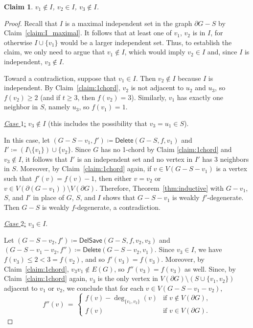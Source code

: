 \documentclass[11pt]{article}
\theoremstyle{slantthm}
\newtheorem{claim}{Claim}%
\numberwithin{equation}{section}
\theoremstyle{definition}
\renewcommand{\leq}{\leqslant}
\renewcommand{\geq}{\geqslant}
\newcommand{\defeq}{\coloneqq}
\newcommand{\bemph}[1]{{\normalfont#1}}
\newcommand{\ep}[1]{\bemph{(}#1\bemph{)}}
\numberwithin{equation}{section}
\newcommand{\0}{\varnothing}
\newcommand{\set}[1]{\{#1\}}
\newcommand{\del}{\mathsf{Delete}}
\newcommand{\delsave}{\mathsf{DelSave}}
\newcommand{\bdry}[1]{{\partial #1}}
\begin{document}
    \begin{claim}\label{claim:in}
        $v_1 \notin I$, $v_2 \in I$, $v_3 \notin I$.
    \end{claim}
    \begin{proof}
        Recall that $I$ is a maximal independent set in the graph $\bdry{G} - S$ by Claim~\ref{claim:I_maximal}. It follows that at least one of $v_1$, $v_2$ is in $I$, for otherwise $I \cup \set{v_1}$ would be a larger independent set. Thus, to establish the claim, we only need to argue that $v_1 \notin I$, which would imply $v_2 \in I$ and, since $I$ is independent, $v_3 \notin I$.
    
    Toward a contradiction, suppose that $v_1 \in I$. Then $v_2 \notin I$ because $I$ is independent. By Claim~\ref{claim:1chord}, $v_2$ is not adjacent to $u_2$ and $u_3$, so $f(v_2) \geq 2$ (and if $t \geq 3$, then $f(v_2) = 3$). Similarly, $v_1$ has exactly one neighbor in $S$, namely $u_3$, so $f(v_1) = 1$.

    \smallskip
    
    \underline{\emph{Case} $1$:} $v_3 \notin I$ (this includes the possibility that $v_3 = u_1 \in S$).

    \smallskip

    In this case, let $(G - S - v_1,f')\defeq \del(G-S, f, v_1)$ and $I'\defeq (I \setminus \set{v_1}) \cup \set{v_2}$. Since $G$ has no 1-chord by Claim \ref{claim:1chord} and $v_3 \notin I$, it follows that $I'$ is an independent set and no vertex in $I'$ has $3$ neighbors in $S$. Moreover, by Claim~\ref{claim:1chord} again, if $v \in V(G - S - v_1)$ is a vertex such that $f'(v) = f(v) - 1$, then either $v = v_2$ or $v \in V(\bdry{(G-v_1)}) \setminus V(\bdry{G})$. Therefore, Theorem~\ref{thm:inductive} with $G - v_1$, $S$, and $I'$ in place of $G$, $S$, and $I$ shows that $G - S - v_1$ is weakly $f'$-degenerate. Then $G-S$ is weakly $f$-degenerate, a contradiction.

    \smallskip
    
    \underline{\emph{Case} $2$:} $v_3 \in I$.

    \smallskip
    
    Let $(G -S - v_2, f') \defeq \delsave(G-S,f,v_2,v_3)$ and $(G - S - v_1 - v_2, f'') \defeq \del(G - S - v_2, v_1)$. %
    Since $v_3 \in I$, we have $f(v_3) \leq 2 < 3 = f(v_2)$, and so $f'(v_3) = f(v_3)$. Moreover, by Claim~\ref{claim:1chord}, $v_3v_1 \notin E(G)$, so $f''(v_3) = f(v_3)$ as well. Since, by Claim~\ref{claim:1chord} again, $v_3$ is the only vertex in $V(\bdry{G}) \setminus (S \cup \set{v_1, v_2})$ adjacent to $v_1$ or $v_2$, we conclude that for each $v \in V(G - S - v_1 - v_2)$,
    \[
        f''(v) \,=\, \begin{cases}
                    f(v) - \deg_{\set{v_1, v_2}}(v) &\text{if } v \notin V(\bdry{G}),\\
                    f(v) &\text{if } v \in V(\bdry{G}).
                    \end{cases}
    \]


\end{proof}
\end{document}

